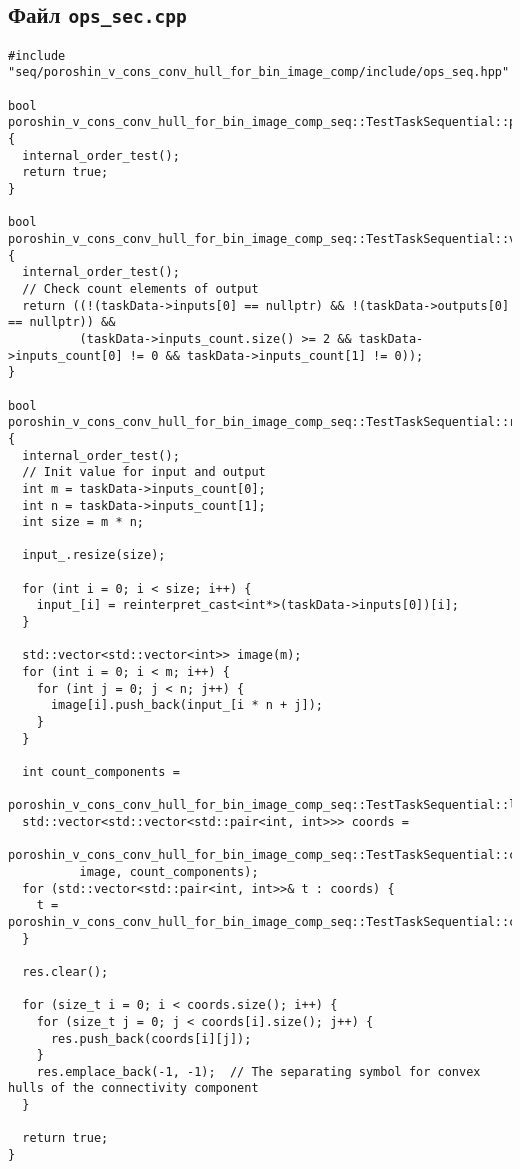\documentclass[12pt]{article}
\begin{document}
\subsection*{Файл \texttt{ops\_sec.cpp}}
\begin{verbatim}
#include "seq/poroshin_v_cons_conv_hull_for_bin_image_comp/include/ops_seq.hpp"

bool poroshin_v_cons_conv_hull_for_bin_image_comp_seq::TestTaskSequential::pre_processing() {
  internal_order_test();
  return true;
}

bool poroshin_v_cons_conv_hull_for_bin_image_comp_seq::TestTaskSequential::validation() {
  internal_order_test();
  // Check count elements of output
  return ((!(taskData->inputs[0] == nullptr) && !(taskData->outputs[0] == nullptr)) &&
          (taskData->inputs_count.size() >= 2 && taskData->inputs_count[0] != 0 && taskData->inputs_count[1] != 0));
}

bool poroshin_v_cons_conv_hull_for_bin_image_comp_seq::TestTaskSequential::run() {
  internal_order_test();
  // Init value for input and output
  int m = taskData->inputs_count[0];
  int n = taskData->inputs_count[1];
  int size = m * n;

  input_.resize(size);

  for (int i = 0; i < size; i++) {
    input_[i] = reinterpret_cast<int*>(taskData->inputs[0])[i];
  }

  std::vector<std::vector<int>> image(m);
  for (int i = 0; i < m; i++) {
    for (int j = 0; j < n; j++) {
      image[i].push_back(input_[i * n + j]);
    }
  }

  int count_components =
      poroshin_v_cons_conv_hull_for_bin_image_comp_seq::TestTaskSequential::label_connected_components(image);
  std::vector<std::vector<std::pair<int, int>>> coords =
      poroshin_v_cons_conv_hull_for_bin_image_comp_seq::TestTaskSequential::coordinates_connected_components(
          image, count_components);
  for (std::vector<std::pair<int, int>>& t : coords) {
    t = poroshin_v_cons_conv_hull_for_bin_image_comp_seq::TestTaskSequential::convex_hull(t);
  }

  res.clear();

  for (size_t i = 0; i < coords.size(); i++) {
    for (size_t j = 0; j < coords[i].size(); j++) {
      res.push_back(coords[i][j]);
    }
    res.emplace_back(-1, -1);  // The separating symbol for convex hulls of the connectivity component
  }

  return true;
}


\end{verbatim}
\end{document}
